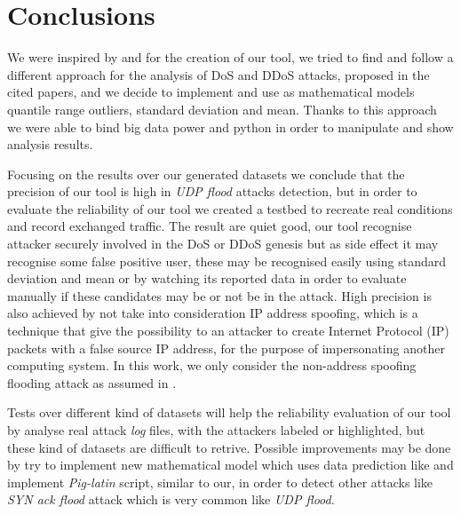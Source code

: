 \section{Conclusions}
\label{sec:colc}
We were inspired by \cite{detection_by_path_analaysis} and \cite{ddos_forensics} for the creation of our tool, we tried to find and follow a different approach for the analysis of DoS and DDoS attacks, proposed in the cited papers, and we decide to implement and use as mathematical models quantile range outliers, standard deviation and mean. Thanks to this approach we were able to bind big data power and python in order to manipulate and show analysis results.  

Focusing on the results over our generated datasets we conclude that the precision of our tool is high in \textit{UDP flood} attacks detection, but in order to evaluate the reliability of our tool we created a testbed to recreate real conditions and record exchanged traffic. The result are quiet good, our tool recognise attacker securely involved in the DoS or DDoS genesis but as side effect it may recognise some false positive user, these may be recognised easily using standard deviation and mean or by watching its reported data in order to evaluate manually if these candidates may be or not be in the attack. High precision is also achieved by not take into consideration IP address spoofing, which is a technique that give the possibility to an attacker to create Internet Protocol (IP) packets with a false source IP address, for the purpose of impersonating another computing system. In this work, we only consider the non-address spoofing flooding attack as assumed in \cite{ddos_forensics}. 

Tests over different kind of datasets will help the reliability evaluation of our tool by analyse real attack \textit{log} files, with the attackers labeled or highlighted, but these kind of datasets are difficult to retrive. 
Possible improvements may be done by try to implement new mathematical model which uses data prediction like \cite{detection_by_path_analaysis} and implement \textit{Pig-latin} script, similar to our, in order to detect other attacks like \textit{SYN ack flood} attack which is very common like \textit{UDP flood}. 